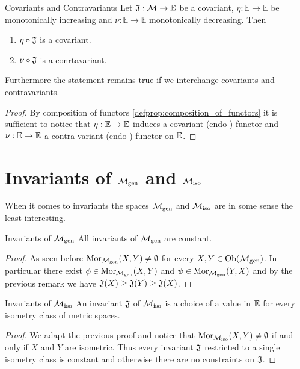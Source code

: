 \begin{proposition}{Covariants and Contravariants}{}
Let $\mathfrak{J}: \mathcal{M} \to \mathbb E$ be a covariant, $\eta: \mathbb{E} \to \mathbb{E}$ be monotonically increasing
and $\nu: \mathbb{E} \to \mathbb{E}$ monotonically decreasing. Then
\begin{enumerate}
    \item $\eta \circ \mathfrak{J}$ is a covariant.
    \item $\nu \circ \mathfrak{J}$ is a conrtavariant.
\end{enumerate}
Furthermore the statement remains true if we interchange covariants and contravariants.
\end{proposition}

\begin{proof}
By composition of functors \ref{defprop:composition_of_functors} it is sufficient to notice that $\eta: \mathbb E \to \mathbb E$ induces a covariant (endo-) functor and $\nu: \mathbb E \to \mathbb E$ a contra variant (endo-) functor on $\mathbb E$.
\end{proof}


\section{Invariants of ${\mathcal{M}_\mathrm{gen}}$ and ${\mathcal{M}_\mathrm{iso}}$}
When it comes to invariants the spaces ${\mathcal{M}_\mathrm{gen}}$ and ${\mathcal{M}_\mathrm{iso}}$ are in some sense the least interesting.

\begin{proposition}{Invariants of ${\mathcal{M}_\mathrm{gen}}$}{}
All invariants of ${\mathcal{M}_\mathrm{gen}}$ are constant.
\end{proposition}
\begin{proof}
As seen before $\mathrm {Mor}_{\mathcal{M}_\mathrm{gen}}(X,Y) \neq \emptyset$ for every $X,Y \in \mathrm {Ob}({\mathcal{M}_\mathrm{gen}})$. In particular there exist $\phi \in \mathrm {Mor}_{\mathcal{M}_\mathrm{gen}}(X,Y)$ and $\psi \in \mathrm {Mor}_{\mathcal{M}_\mathrm{gen}}(Y,X)$ and by the previous remark we have $\mathfrak{J}(X) \geq \mathfrak{J}(Y) \geq \mathfrak{J}(X)$.
\end{proof}

\begin{proposition}{Invariants of ${\mathcal{M}_\mathrm{iso}}$}{}
An invariant $\mathfrak{J}$ of ${\mathcal{M}_\mathrm{iso}}$ is a choice of a value in $\mathbb E$ for every isometry class of metric spaces.
\end{proposition}

\begin{proof}
We adapt the previous proof and notice that $\mathrm {Mor}_{\mathcal{M}_\mathrm{iso}}(X,Y) \neq \emptyset$ if and only if $X$ and $Y$ are isometric. Thus every invariant $\mathfrak{J}$ restricted to a single isometry class is constant and otherwise there are no constraints on $\mathfrak{J}$.
\end{proof}

